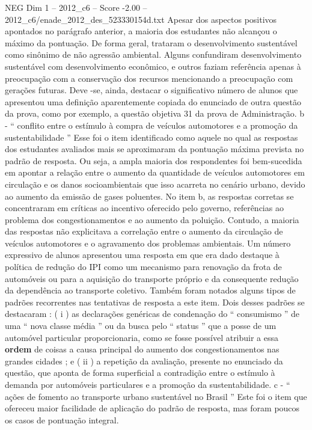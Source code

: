 \begin{textsample}{NEG Dim 1 – 2012\_c6 – Score -2.00 – 2012\_c6/enade\_2012\_des\_523330154d.txt}
Apesar dos aspectos positivos apontados no parágrafo anterior, a maioria dos estudantes não alcançou o máximo da pontuação.
De forma geral, trataram o desenvolvimento sustentável como sinônimo de não agressão ambiental.
Alguns confundiram desenvolvimento sustentável com desenvolvimento econômico, e outros faziam referência apenas à preocupação com a conservação dos recursos mencionando a preocupação com gerações futuras.
Deve -se, ainda, destacar o significativo número de alunos que apresentou uma definição aparentemente copiada do enunciado de outra questão da prova, como por exemplo, a questão objetiva 31 da prova de Administração. b - “ conflito entre o estímulo à compra de veículos automotores e a promoção da sustentabilidade ” Esse foi o item identificado como aquele no qual as respostas dos estudantes avaliados mais se aproximaram da pontuação máxima prevista no padrão de resposta.
Ou seja, a ampla maioria dos respondentes foi bem-sucedida em apontar a relação entre o aumento da quantidade de veículos automotores em circulação e os danos socioambientais que isso acarreta no cenário urbano, devido ao aumento da emissão de gases poluentes.
No item b, as respostas corretas se concentraram em críticas ao incentivo oferecido pelo governo, referências ao problema dos congestionamentos e ao aumento da poluição.
Contudo, a maioria das respostas não explicitava a correlação entre o aumento da circulação de veículos automotores e o agravamento dos problemas ambientais.
Um número expressivo de alunos apresentou uma resposta em que era dado destaque à política de redução do IPI como um mecanismo para renovação da frota de automóveis ou para a aquisição do transporte próprio e da consequente redução da dependência ao transporte coletivo.
Também foram notados alguns tipos de padrões recorrentes nas tentativas de resposta a este item.
Dois desses padrões se destacaram : ( i ) as declarações genéricas de condenação do “ consumismo ” de uma “ nova classe média ” ou da busca pelo “ status ” que a posse de um automóvel particular proporcionaria, como se fosse possível atribuir a essa \textbf{ordem} de coisas a causa principal do aumento dos congestionamentos nas grandes cidades ; e ( ii ) a repetição da avaliação, presente no enunciado da questão, que aponta de forma superficial a contradição entre o estímulo à demanda por automóveis particulares e a promoção da sustentabilidade. c - “ ações de fomento ao transporte urbano sustentável no Brasil ” Este foi o item que ofereceu maior facilidade de aplicação do padrão de resposta, mas foram poucos os casos de pontuação integral.

\end{textsample}
